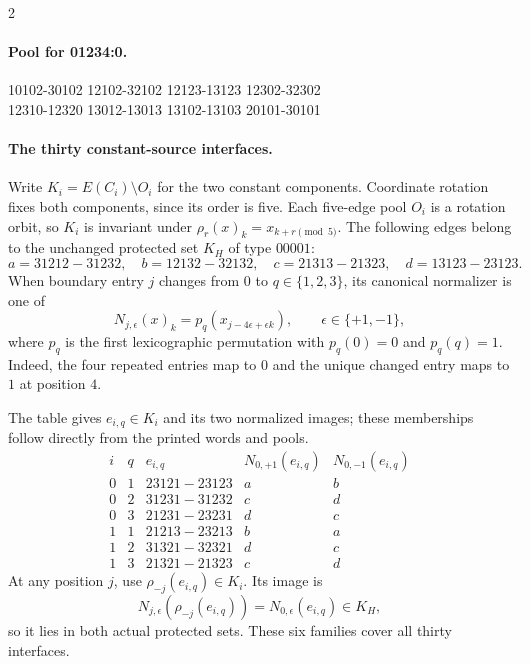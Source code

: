 \begin{multicols}{2}
\paragraph{Pool for 01234:0.}
\begingroup\footnotesize\ttfamily\begin{flushleft}
10102-30102 12102-32102 12123-13123 12302-32302\\
12310-12320 13012-13013 13102-13103 20101-30101\\
\end{flushleft}\endgroup
\end{multicols}
\endgroup
\paragraph{The thirty constant-source interfaces.}
Write $K_i=E(C_i)\setminus O_i$ for the two constant components.
Coordinate rotation fixes both components, since its order is five.
Each five-edge pool $O_i$ is a rotation orbit, so $K_i$ is invariant
under $\rho_r(x)_k=x_{k+r\pmod5}$. The following edges belong to
the unchanged protected set $K_H$ of type $00001$:
\[
a=31212\!-31232,\quad b=12132\!-32132,\quad
c=21313\!-21323,\quad d=13123\!-23123.
\]
When boundary entry $j$ changes from $0$ to $q\in\{1,2,3\}$,
its canonical normalizer is one of
\[
 N_{j,\epsilon}(x)_k=p_q(x_{j-4\epsilon+\epsilon k}),
 \qquad \epsilon\in\{+1,-1\},
\]
where $p_q$ is the first lexicographic permutation with $p_q(0)=0$
and $p_q(q)=1$. Indeed, the four repeated entries map to $0$ and
the unique changed entry maps to $1$ at position $4$.
\par{}
The table gives $e_{i,q}\in K_i$ and its two normalized images;
these memberships follow directly from the printed words and pools.
\[
\begin{array}{cc|c|cc}
i&q&e_{i,q}&N_{0,+1}(e_{i,q})&N_{0,-1}(e_{i,q})\\ \hline
0&1&23121\!-23123&a&b\\
0&2&31231\!-31232&c&d\\
0&3&21231\!-23231&d&c\\
1&1&21213\!-23213&b&a\\
1&2&31321\!-32321&d&c\\
1&3&21321\!-21323&c&d
\end{array}
\]
At any position $j$, use $\rho_{-j}(e_{i,q})\in K_i$. Its image is
\[
 N_{j,\epsilon}(\rho_{-j}(e_{i,q}))
      =N_{0,\epsilon}(e_{i,q})\in K_H,
\]
so it lies in both actual protected sets. These six families cover
all thirty interfaces.

